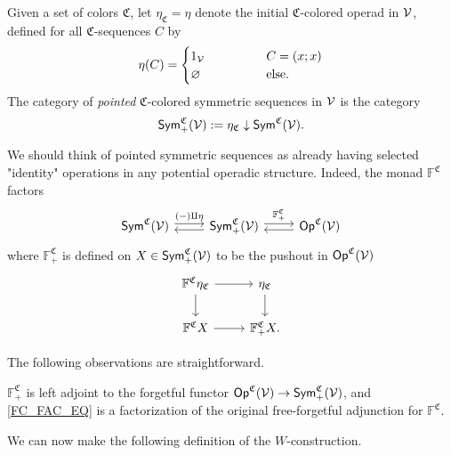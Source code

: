 \documentclass[a4paper,10pt
,draft
]{article}%
\renewcommand{\1}{\eta}%
\begin{document}
\begin{definition}
      Given a set of colors $\mathfrak C$, let $\eta_{\mathfrak C} = \eta$ denote the initial $\mathfrak C$-colored operad in $\mathcal V$,
      defined for all $\mathfrak C$-sequences $C$ by
      \[
            \eta(C) =
            \begin{cases}
                  1_{\mathcal V} \qquad \qquad & C = (x;x)
                  \\
                  \varnothing & \mbox{else.}
            \end{cases}
      \]
      The category of \textit{pointed} $\mathfrak C$-colored symmetric sequences in $\mathcal V$ is the category
      \[
            \mathsf{Sym}^{\mathfrak C}_+(\mathcal V) := \eta_{\mathfrak C} \downarrow \mathsf{Sym}^{\mathfrak C}(\mathcal V).
      \]
\end{definition}
We should think of pointed symmetric sequences as already having selected "identity" operations in any potential operadic structure.
Indeed, the monad $\mathbb F^{\mathfrak C}$ factors
\begin{equation}
      \label{FC_FAC_EQ}
      \begin{tikzcd}
            \Sym^{\mathfrak C}(\V) \arrow[r, shift left, "{(-) \amalg \eta}"]
            &
            \Sym^{\mathfrak C}_+(\V) \arrow[l, shift left] \arrow[r, shift left, "\mathbb F^{\mathfrak C}_+"]
            &
            \Op^{\mathfrak C}(\V) \arrow[l, shift left]
      \end{tikzcd}
\end{equation}
where $\mathbb F^{\mathfrak C}_+$ is defined on $X \in \mathsf{Sym}^{\mathfrak C}_+(\mathcal V)$ to be the pushout in $\mathsf{Op}^{\mathfrak C}(\mathcal V)$
\[
      \begin{tikzcd}
            \mathbb F^{\mathfrak C} \eta_{\mathfrak C} \arrow[d] \arrow[r]
            &
            \eta_{\mathfrak C} \arrow[d]
            \\
            \mathbb F^{\mathfrak C} X \arrow[r]
            &
            \mathbb F^{\mathfrak C}_+ X.
      \end{tikzcd}
\]

The following observations are straightforward.
\begin{lemma}
      $\mathbb F^{\mathfrak C}_+$ is left adjoint to the forgetful functor $\mathsf{Op}^{\mathfrak C}(\mathcal V) \to \mathsf{Sym}^{\mathfrak C}_+(\mathcal V)$,
      and \eqref{FC_FAC_EQ} is a factorization of the original free-forgetful adjunction for $\mathbb F^{\mathfrak C}$. 
\end{lemma}

We can now make the following definition of the $W$-construction.
\end{document}
